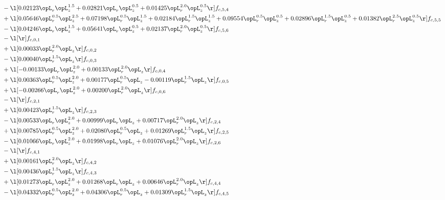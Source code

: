 \begin{alignat}{2}
& - \l[  0.02123 \opL_r \opL_z^{1.5} +  0.02821 \opL_r \opL_z^{0.5} +  0.01425 \opL_r^{2.0} \opL_z^{0.5}  \r] f_{c,5,4} \nonumber \\ 
& + \l[  0.05646 \opL_r^{0.5} \opL_z^{2.5} +  0.07198 \opL_r^{0.5} \opL_z^{1.5} +  0.02184 \opL_r^{1.5} \opL_z^{1.5} +  0.09554 \opL_r^{0.5} \opL_z^{0.5} +  0.02896 \opL_r^{1.5} \opL_z^{0.5} +  0.01382 \opL_r^{2.5} \opL_z^{0.5}  \r] f_{c,5,5} \nonumber \\ 
& - \l[  0.04246 \opL_r \opL_z^{1.5} +  0.05641 \opL_r \opL_z^{0.5} +  0.02137 \opL_r^{2.0} \opL_z^{0.5}  \r] f_{c,5,6} \nonumber \\ 
& - \l[  \r] f_{c,0,1} \nonumber \\ 
& + \l[  0.00033 \opL_r^{2.0} \opL_z  \r] f_{c,0,2} \nonumber \\ 
& - \l[  0.00040 \opL_r^{1.5} \opL_z  \r] f_{c,0,3} \nonumber \\ 
& + \l[  -0.00133 \opL_r \opL_z^{2.0} +  0.00133 \opL_r^{2.0} \opL_z  \r] f_{c,0,4} \nonumber \\ 
& + \l[  0.00363 \opL_r^{0.5} \opL_z^{2.0} +  0.00177 \opL_r^{0.5} \opL_z   -0.00119 \opL_r^{1.5} \opL_z  \r] f_{c,0,5} \nonumber \\ 
& + \l[  -0.00266 \opL_r \opL_z^{2.0} +  0.00200 \opL_r^{2.0} \opL_z  \r] f_{c,0,6} \nonumber \\ 
& - \l[  \r] f_{c,2,1} \nonumber \\ 
& + \l[  0.00423 \opL_r^{1.5} \opL_z  \r] f_{c,2,3} \nonumber \\ 
& - \l[  0.00533 \opL_r \opL_z^{2.0} +  0.00999 \opL_r \opL_z +  0.00717 \opL_r^{2.0} \opL_z  \r] f_{c,2,4} \nonumber \\ 
& + \l[  0.00785 \opL_r^{0.5} \opL_z^{2.0} +  0.02080 \opL_r^{0.5} \opL_z +  0.01269 \opL_r^{1.5} \opL_z  \r] f_{c,2,5} \nonumber \\ 
& - \l[  0.01066 \opL_r \opL_z^{2.0} +  0.01998 \opL_r \opL_z +  0.01076 \opL_r^{2.0} \opL_z  \r] f_{c,2,6} \nonumber \\ 
& - \l[  \r] f_{c,4,1} \nonumber \\ 
& + \l[  0.00161 \opL_r^{2.0} \opL_z  \r] f_{c,4,2} \nonumber \\ 
& - \l[  0.00436 \opL_r^{1.5} \opL_z  \r] f_{c,4,3} \nonumber \\ 
& + \l[  0.01273 \opL_r \opL_z^{2.0} +  0.01268 \opL_r \opL_z +  0.00646 \opL_r^{2.0} \opL_z  \r] f_{c,4,4} \nonumber \\ 
& - \l[  0.04332 \opL_r^{0.5} \opL_z^{2.0} +  0.04306 \opL_r^{0.5} \opL_z +  0.01309 \opL_r^{1.5} \opL_z  \r] f_{c,4,5} \nonumber \\ 

\end{alignat}
